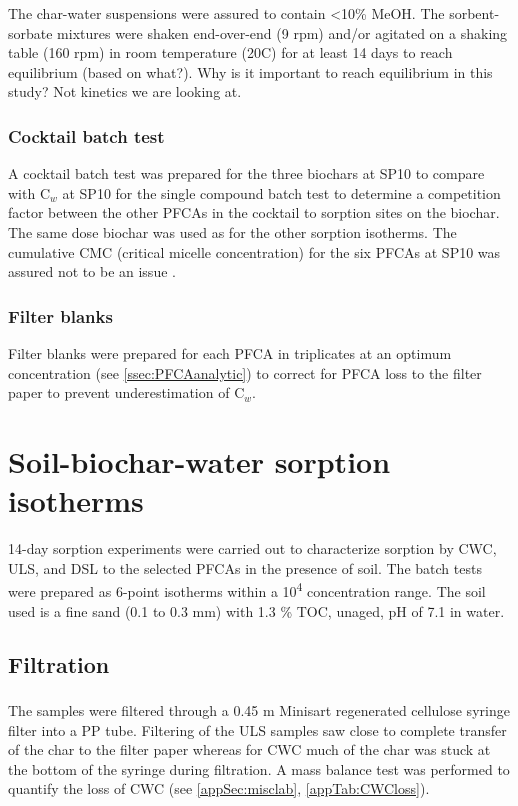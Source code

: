 The char-water suspensions were assured to contain \textless 10\% MeOH. The sorbent-sorbate mixtures were shaken end-over-end (9 rpm) and/or agitated on a shaking table (160 rpm) in room temperature (20\textdegree C) for at least 14 days to reach equilibrium (based on what?). Why is it important to reach equilibrium in this study? Not kinetics we are looking at. 

\subsubsection{Cocktail batch test}
A cocktail batch test was prepared for the three biochars at SP10 to compare with C$_w$ at SP10 for the single compound batch test to determine a competition factor between the other PFCAs in the cocktail to sorption sites on the biochar. The same dose biochar was used as for the other sorption isotherms. The cumulative CMC (critical micelle concentration) for the six PFCAs at SP10 was assured not to be an issue \citep{bhhatarai2011}. 

\subsubsection{Filter blanks}
Filter blanks were prepared for each PFCA in triplicates at an optimum concentration (see \cref{ssec:PFCAanalytic}) to correct for PFCA loss to the filter paper to prevent underestimation of C$_w$. 

\section{Soil-biochar-water sorption isotherms}
14-day sorption experiments were carried out to characterize sorption by CWC, ULS, and DSL to the selected PFCAs in the presence of soil. The batch tests were prepared as 6-point isotherms within a 10\textsuperscript{4} concentration range. The soil used is a fine sand (0.1 to 0.3 mm) with 1.3 \% TOC, unaged, pH of 7.1 in water. 

\subsection{Filtration}
The samples were filtered through a 0.45 \textmu m Minisart\textsuperscript{\textregistered} regenerated cellulose syringe filter into a PP tube. Filtering of the ULS samples saw close to complete transfer of the char to the filter paper whereas for CWC much of the char was stuck at the bottom of the syringe during filtration. A mass balance test was performed to quantify the loss of CWC (see \cref{appSec:misclab}, \cref{appTab:CWCloss}).


